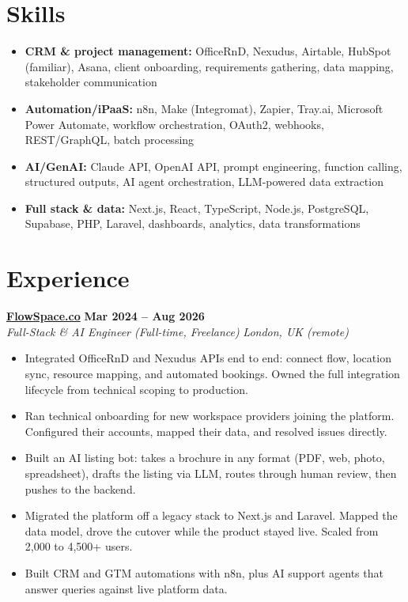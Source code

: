 \documentclass[a4paper,10pt]{article}
\newcommand{\role}[4]{%
 \textbf{#1} \hfill \textbf{#2}\\[1pt]%
 \textit{#3} \hfill \textit{#4}\\[2pt]%
}
\begin{document}
\section{Skills}
\begin{itemize}
 \item \textbf{CRM \& project management:} OfficeRnD, Nexudus, Airtable, HubSpot (familiar), Asana, client onboarding, requirements gathering, data mapping, stakeholder communication
 \item \textbf{Automation/iPaaS:} n8n, Make (Integromat), Zapier, Tray.ai, Microsoft Power Automate, workflow orchestration, OAuth2, webhooks, REST/GraphQL, batch processing
 \item \textbf{AI/GenAI:} Claude API, OpenAI API, prompt engineering, function calling, structured outputs, AI agent orchestration, LLM-powered data extraction
 \item \textbf{Full stack \& data:} Next.js, React, TypeScript, Node.js, PostgreSQL, Supabase, PHP, Laravel, dashboards, analytics, data transformations
\end{itemize}

\section{Experience}

\role{\href{https://flowspace.co}{FlowSpace.co}}{Mar 2024 -- Aug 2026}{Full-Stack \& AI Engineer (Full-time, Freelance)}{London, UK (remote)}
\begin{itemize}
 \item Integrated OfficeRnD and Nexudus APIs end to end: connect flow, location sync, resource mapping, and automated bookings. Owned the full integration lifecycle from technical scoping to production.
 \item Ran technical onboarding for new workspace providers joining the platform. Configured their accounts, mapped their data, and resolved issues directly.
 \item Built an AI listing bot: takes a brochure in any format (PDF, web, photo, spreadsheet), drafts the listing via LLM, routes through human review, then pushes to the backend.
 \item Migrated the platform off a legacy stack to Next.js and Laravel. Mapped the data model, drove the cutover while the product stayed live. Scaled from 2,000 to 4,500+ users.
 \item Built CRM and GTM automations with n8n, plus AI support agents that answer queries against live platform data.
\end{itemize}
\end{document}
